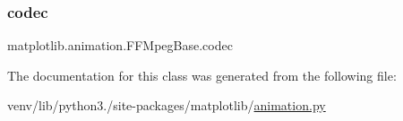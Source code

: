 \subsubsection{\texorpdfstring{codec}{codec}}
{\footnotesize\ttfamily matplotlib.\+animation.\+F\+F\+Mpeg\+Base.\+codec}



The documentation for this class was generated from the following file\+:\begin{DoxyCompactItemize}
\item 
venv/lib/python3./site-\/packages/matplotlib/\hyperlink{animation_8py}{animation.\+py}\end{DoxyCompactItemize}
